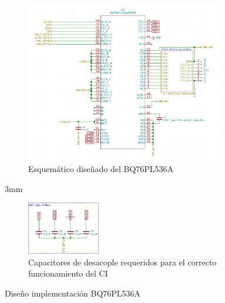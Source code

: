 \documentclass[10pt, a4paper]{article}
\begin{document}
\begin{figure}[!h]
    \begin{subfigure}[b]{\textwidth}
        \begin{center}
            \includegraphics[width=0.95\textwidth]{bq76_implementation.png}
            \caption{Esquem\'atico diseñado del BQ76PL536A}
            \label{fig:bq76_implementation_sch}
        \end{center}
    \end{subfigure}

    \hfill{3mm}

    \begin{subfigure}[b]{\textwidth}
        \begin{center}
            \includegraphics[width=0.35\textwidth]{bq76_desacople.png}
            \caption{Capacitores de desacople requeridos para el correcto
            funcionamiento del \acrshort{CI}}
            \label{fig:bq76_implementation_uncouple}
        \end{center}
    \end{subfigure}
            \caption{Diseño implementación BQ76PL536A}
            \label{fig:bq76_implementation}
\end{figure}
\end{document}
